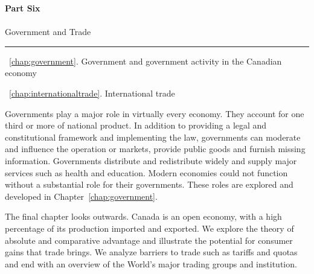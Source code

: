 \cleardoublepage
\thispagestyle{empty}
\vspace{30mm}
{\color{parttextcolour}\fontsize{1.25cm}{3em}\selectfont\textbf{Part Six}} \\ \\
{\color{parttextcolour}\huge Government and Trade}

\vspace{10mm}
{\color{partlinecolour}\rule{25em}{2pt}}
\vspace{10mm}

{\large\color{parttextcolour}
~\ref{chap:government}. Government and government activity in the Canadian economy

~\ref{chap:internationaltrade}. International trade}

\vspace{10mm}

{\normalfont Governments play a major role in virtually every economy. They account for one third or more of national product. In addition to providing a legal and constitutional framework and implementing the law, governments can moderate and influence the operation or markets, provide public goods and furnish missing information. Governments distribute and redistribute widely and supply major services such as health and education. Modern economies could not function without a substantial role for their governments. These roles are explored and developed in Chapter~\ref{chap:government}.

The final chapter looks outwards. Canada is an open economy, with a high percentage of its production imported and exported. We explore the theory of absolute and comparative advantage and illustrate the potential for consumer gains that trade brings. We analyze barriers to trade such as tariffs and quotas and end with an overview of the World's major trading groups and institution.}

